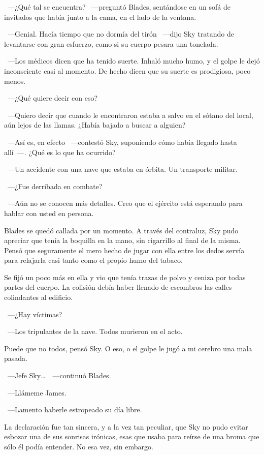 ~---¿Qué tal se encuentra? ~---preguntó Blades, sentándose en un sofá de invitados que había junto a la cama, en el lado de la ventana.

~---Genial. Hacía tiempo que no dormía del tirón ~---dijo Sky tratando de levantarse con gran esfuerzo, como si su cuerpo pesara una tonelada.

~---Los médicos dicen que ha tenido suerte. Inhaló mucho humo, y el golpe le dejó inconsciente casi al momento. De hecho dicen que su suerte es prodigiosa, poco menos.

~---¿Qué quiere decir con eso?

~---Quiero decir que cuando le encontraron estaba a salvo en el sótano del local, aún lejos de las llamas. ¿Había bajado a buscar a alguien?

~---Así es, en efecto ~---contestó Sky, suponiendo cómo había llegado hasta allí~---. ¿Qué es lo que ha ocurrido?

~---Un accidente con una nave que estaba en órbita. Un transporte militar.

~---¿Fue derribada en combate?

~---Aún no se conocen más detalles. Creo que el ejército está esperando para hablar con usted en persona.

Blades se quedó callada por un momento. A través del contraluz, Sky pudo apreciar que tenía la boquilla en la mano, sin cigarrillo al final de la misma. Pensó que seguramente el mero hecho de jugar con ella entre los dedos servía para relajarla casi tanto como el propio humo del tabaco.

Se fijó un poco más en ella y vio que tenía trazas de polvo y ceniza por todas partes del cuerpo. La colisión debía haber llenado de escombros las calles colindantes al edificio.

~---¿Hay víctimas?

~---Los tripulantes de la nave. Todos murieron en el acto.

Puede que no todos, pensó Sky. O eso, o el golpe le jugó a mi cerebro una mala pasada.

~---Jefe Sky\dots\ ~---continuó Blades.

~---Llámeme James.

~---Lamento haberle estropeado su día libre.

La declaración fue tan sincera, y a la vez tan peculiar, que Sky no pudo evitar esbozar una de sus sonrisas irónicas, esas que usaba para reírse de una broma que sólo él podía entender. No esa vez, sin embargo.

